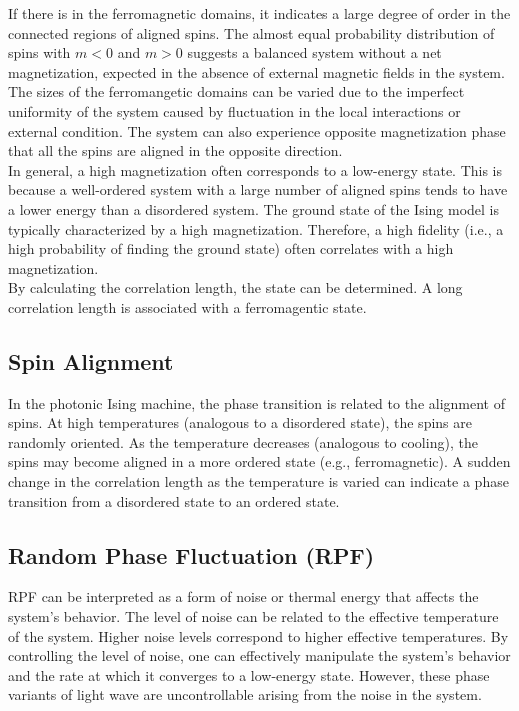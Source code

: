 If there is in the ferromagnetic domains, it indicates a large degree of order in the connected regions of aligned spins. The almost equal probability distribution of spins with $m<0$ and $m>0$ suggests a balanced system without a net magnetization, expected in the absence of external magnetic fields in the system. The sizes of the ferromangetic domains can be varied due to the imperfect uniformity of the system caused by fluctuation in the local interactions or external condition. The system can also experience opposite magnetization phase that all the spins are aligned in the opposite direction. \\

In general, a high magnetization often corresponds to a low-energy state. This is because a well-ordered system with a large number of aligned spins tends to have a lower energy than a disordered system. The ground state of the Ising model is typically characterized by a high magnetization. Therefore, a high fidelity (i.e., a high probability of finding the ground state) often correlates with a high magnetization. \\

By calculating the correlation length, the state can be determined. A long correlation length is associated with a ferromagentic state. \\

\subsection{Spin Alignment}
In the photonic Ising machine, the phase transition is related to the alignment of spins. At high temperatures (analogous to a disordered state), the spins are randomly oriented. As the temperature decreases (analogous to cooling), the spins may become aligned in a more ordered state (e.g., ferromagnetic). A sudden change in the correlation length as the temperature is varied can indicate a phase transition from a disordered state to an ordered state.\\

\subsection{Random Phase Fluctuation (RPF)}
RPF can be interpreted as a form of noise or thermal energy that affects the system's behavior. The level of noise can be related to the effective temperature of the system. Higher noise levels correspond to higher effective temperatures. By controlling the level of noise, one can effectively manipulate the system's behavior and the rate at which it converges to a low-energy state. However, these phase variants of light wave are uncontrollable arising from the noise in the system.\\

